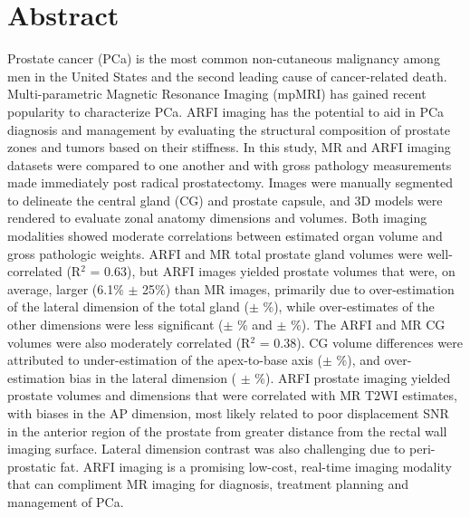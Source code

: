 \section*{Abstract}
Prostate cancer (PCa) is the most common non-cutaneous malignancy among men in
the United States and the second leading cause of cancer-related death.
Multi-parametric Magnetic Resonance Imaging (mpMRI) has gained recent
popularity to characterize PCa.  ARFI imaging has the potential to aid in PCa
diagnosis and management by evaluating the structural composition of prostate
zones and tumors based on their stiffness.  In this study, MR and ARFI imaging
datasets were compared to one another and with gross pathology measurements
made immediately post radical prostatectomy.  Images were manually segmented to
delineate the central gland (CG) and prostate capsule, and 3D models were
rendered to evaluate zonal anatomy dimensions and volumes.  Both imaging
modalities showed moderate correlations between estimated organ volume and
gross pathologic weights.  ARFI and MR total prostate gland volumes were
well-correlated (R$^2$ = 0.63), but ARFI images yielded prostate volumes that
were, on average, larger (6.1\% $\pm$ 25\%) than MR images, primarily due to
over-estimation of the lateral dimension of the total gland
(\ARFImrTotalLatLatMeanPct $\pm$ \ARFImrTotalLatLatStdPct\%), while
over-estimates of the other dimensions were less significant
(\ARFImrTotalAntPostMeanPct $\pm$ \ARFImrTotalAntPostStdPct\% and
\ARFImrTotalApexBaseMeanPct $\pm$ \ARFImrTotalApexBaseStdPct\%).  The ARFI and
MR CG volumes were also moderately correlated (R$^2$ = 0.38).  CG volume
differences were attributed to under-estimation of the apex-to-base axis
(\ARFImrCentralApexBaseMeanPct $\pm$ \ARFImrCentralApexBaseStdPct\%), and
over-estimation bias in the lateral dimension (\ARFImrCentralLatLatMeanPct
$\pm$ \ARFImrCentralLatLatStdPct\%).  ARFI prostate imaging yielded prostate
volumes and dimensions that were correlated with MR T2WI estimates, with biases
in the AP dimension, most likely related to poor displacement SNR in the
anterior region of the prostate from greater distance from the rectal wall
imaging surface.  Lateral dimension contrast was also challenging due to
peri-prostatic fat.  ARFI imaging is a promising low-cost, real-time imaging
modality that can compliment MR imaging for diagnosis, treatment planning and
management of PCa.
